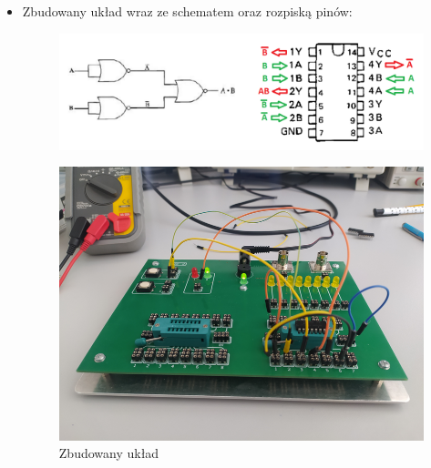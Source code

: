        \begin{itemize}
            \item Zbudowany układ wraz ze schematem oraz rozpiską pinów:
                \begin{figure}[H]
                    \centering
                    \includegraphics[width=\textwidth]{img/schemes_with_pins/NOR_and_w_pins.png}
                    \label{NOR:schemat_and_w_pins}
                \end{figure}
                \begin{figure}[H]
                    \centering
                    \includegraphics[width=\textwidth]{img/NOR/funkcje/1652306732425_scaled.png}
                    \caption{Zbudowany układ}
                    \label{NOR:zbudowany_układ_AND}
                \end{figure}
                    
            \pagebreak        
                    

\end{itemize}
